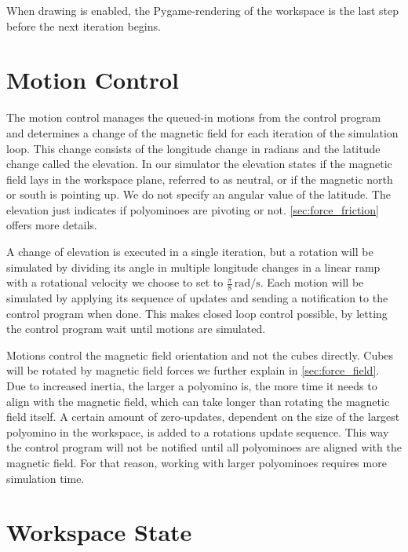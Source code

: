 When drawing is enabled, the Pygame-rendering of the workspace is the last step before the next iteration begins.


\section{Motion Control}
\label{sec:motion_control}

The motion control manages the queued-in motions from the control program and determines a change of the magnetic field for each iteration of the simulation loop.
This change consists of the longitude change in radians and the latitude change called the elevation.
In our simulator the elevation states if the magnetic field lays in the workspace plane, referred to as neutral, or if the magnetic north or south is pointing up.
We do not specify an angular value of the latitude.
The elevation just indicates if polyominoes are pivoting or not.
\autoref{sec:force_friction} offers more details.

A change of elevation is executed in a single iteration, but a rotation will be simulated by dividing its angle in multiple longitude changes in a linear ramp with a rotational velocity we choose to set to $\frac{\pi}{8} \, \text{rad}/\text{s}$.
Each motion will be simulated by applying its sequence of updates and sending a notification to the control program when done.
This makes closed loop control possible, by letting the control program wait until motions are simulated.

Motions control the magnetic field orientation and not the cubes directly.
Cubes will be rotated by magnetic field forces we further explain in \autoref{sec:force_field}.
Due to increased inertia, the larger a polyomino is, the more time it needs to align with the magnetic field, which can take longer than rotating the magnetic field itself.
A certain amount of zero-updates, dependent on the size of the largest polyomino in the workspace, is added to a rotations update sequence.
This way the control program will not be notified until all polyominoes are aligned with the magnetic field.
For that reason, working with larger polyominoes requires more simulation time.


\section{Workspace State}
\label{sec:workspace_state}

